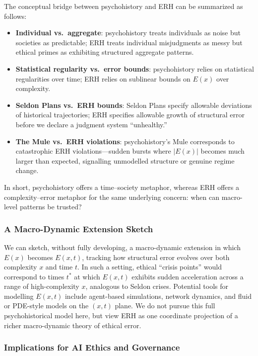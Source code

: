 \documentclass[12pt,a4paper]{article}
\theoremstyle{definition}
\theoremstyle{remark}
\begin{document}
The conceptual bridge between psychohistory and ERH can be summarized as follows:
\begin{itemize}
    \item \textbf{Individual vs.\ aggregate}: psychohistory treats individuals as noise but societies as predictable; ERH treats individual misjudgments as messy but ethical primes as exhibiting structured aggregate patterns.
    \item \textbf{Statistical regularity vs.\ error bounds}: psychohistory relies on statistical regularities over time; ERH relies on sublinear bounds on $E(x)$ over complexity.
    \item \textbf{Seldon Plans vs.\ ERH bounds}: Seldon Plans specify allowable deviations of historical trajectories; ERH specifies allowable growth of structural error before we declare a judgment system ``unhealthy.''
    \item \textbf{The Mule vs.\ ERH violations}: psychohistory's Mule corresponds to catastrophic ERH violations---sudden bursts where $|E(x)|$ becomes much larger than expected, signalling unmodelled structure or genuine regime change.
\end{itemize}
In short, psychohistory offers a time--society metaphor, whereas ERH offers a complexity--error metaphor for the same underlying concern: when can macro-level patterns be trusted?

\subsubsection{A Macro-Dynamic Extension Sketch}

We can sketch, without fully developing, a macro-dynamic extension in which $E(x)$ becomes $E(x,t)$, tracking how structural error evolves over both complexity $x$ and time $t$.
In such a setting, ethical ``crisis points'' would correspond to times $t^\ast$ at which $E(x,t)$ exhibits sudden acceleration across a range of high-complexity $x$, analogous to Seldon crises.
Potential tools for modelling $E(x,t)$ include agent-based simulations, network dynamics, and fluid or PDE-style models on the $(x,t)$ plane.
We do not pursue this full psychohistorical model here, but view ERH as one coordinate projection of a richer macro-dynamic theory of ethical error.

\subsubsection{Implications for AI Ethics and Governance}
\end{document}
